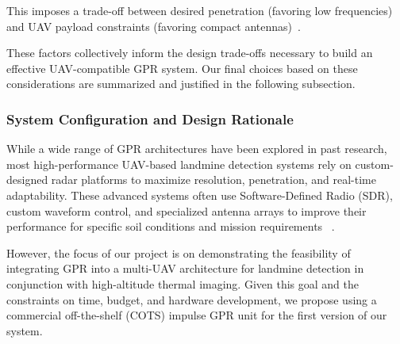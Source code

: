 This imposes a trade-off between desired penetration (favoring low frequencies) and UAV payload constraints (favoring compact antennas)~\cite{alqudsi2021review}.


These factors collectively inform the design trade-offs necessary to build an effective UAV-compatible GPR system. Our final choices based on these considerations are summarized and justified in the following subsection.


\subsubsection{System Configuration and Design Rationale}

While a wide range of GPR architectures have been explored in past research, most high-performance UAV-based landmine detection systems rely on custom-designed radar platforms to maximize resolution, penetration, and real-time adaptability. These advanced systems often use Software-Defined Radio (SDR), custom waveform control, and specialized antenna arrays to improve their performance for specific soil conditions and mission requirements ~\cite{cerquera2017uav}.

However, the focus of our project is on demonstrating the feasibility of integrating GPR into a multi-UAV architecture for landmine detection in conjunction with high-altitude thermal imaging. Given this goal and the constraints on time, budget, and hardware development, we propose using a commercial off-the-shelf (COTS) impulse GPR unit for the first version of our system.

